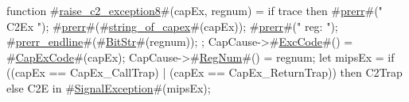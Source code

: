 function #\hyperref[sailMIPSzraisezyc2zyexception8]{raise\_c2\_exception8}#(capEx, regnum) =
  {
    if trace then {
      #\hyperref[sailMIPSzprerr]{prerr}#(" C2Ex ");
      #\hyperref[sailMIPSzprerr]{prerr}#(#\hyperref[sailMIPSzstringzyofzycapex]{string\_of\_capex}#(capEx));
      #\hyperref[sailMIPSzprerr]{prerr}#(" reg: ");
      #\hyperref[sailMIPSzprerrzyendline]{prerr\_endline}#(#\hyperref[sailMIPSzBitStr]{BitStr}#(regnum));
    };
    CapCause->#\hyperref[sailMIPSzExcCode]{ExcCode}#() = #\hyperref[sailMIPSzCapExCode]{CapExCode}#(capEx);
    CapCause->#\hyperref[sailMIPSzRegNum]{RegNum}#()  = regnum;
    let mipsEx =
      if ((capEx == CapEx_CallTrap) | (capEx == CapEx_ReturnTrap))
      then C2Trap else C2E in
    #\hyperref[sailMIPSzSignalException]{SignalException}#(mipsEx);
  }
